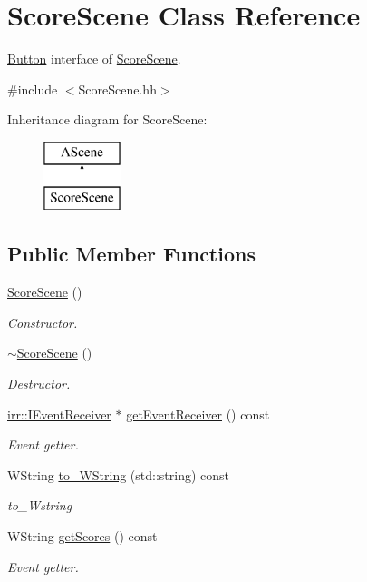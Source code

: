 \hypertarget{classScoreScene}{}\section{Score\+Scene Class Reference}
\label{classScoreScene}


\hyperlink{classButton}{Button} interface of \hyperlink{classScoreScene}{Score\+Scene}.  




{\ttfamily \#include $<$Score\+Scene.\+hh$>$}

Inheritance diagram for Score\+Scene\+:\begin{figure}[H]
\begin{center}
\leavevmode
\includegraphics[height=2.000000cm]{classScoreScene}
\end{center}
\end{figure}
\subsection*{Public Member Functions}
\begin{DoxyCompactItemize}
\item 
\hyperlink{classScoreScene_a832799285cf03c37c18c83d0adde2baa}{Score\+Scene} ()
\begin{DoxyCompactList}\small\item\em Constructor. \end{DoxyCompactList}\item 
\hyperlink{classScoreScene_a1d3866f2c756fea86ec9adfb0a3eeb36}{$\sim$\+Score\+Scene} ()
\begin{DoxyCompactList}\small\item\em Destructor. \end{DoxyCompactList}\item 
\hyperlink{classirr_1_1IEventReceiver}{irr\+::\+I\+Event\+Receiver} $\ast$ \hyperlink{classScoreScene_ae398ba58a33b3605a0c71265202534e2}{get\+Event\+Receiver} () const
\begin{DoxyCompactList}\small\item\em Event getter. \end{DoxyCompactList}\item 
W\+String \hyperlink{classScoreScene_a7cd50a0bd9be501c08f3f2855d61830e}{to\+\_\+\+W\+String} (std\+::string) const
\begin{DoxyCompactList}\small\item\em to\+\_\+\+Wstring \end{DoxyCompactList}\item 
W\+String \hyperlink{classScoreScene_af82d6c841dc42c42d83202d2c7ddf8c9}{get\+Scores} () const
\begin{DoxyCompactList}\small\item\em Event getter. \end{DoxyCompactList}\end{DoxyCompactItemize}


